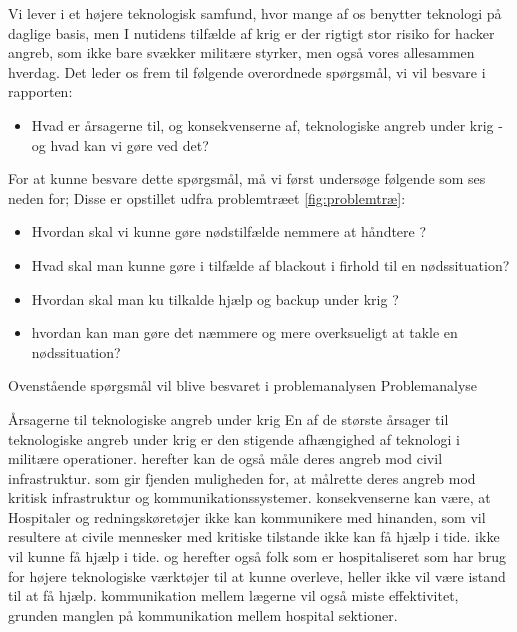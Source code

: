 Vi lever i et højere teknologisk samfund, hvor mange af os benytter teknologi på daglige basis, men I nutidens tilfælde af krig er der rigtigt stor risiko for hacker angreb, som ikke bare svækker militære styrker, men også vores allesammen hverdag.
Det leder os frem til følgende overordnede spørgsmål, vi vil besvare i rapporten:

\begin{itemize}
    \item Hvad er årsagerne til, og konsekvenserne af, teknologiske angreb under krig - og hvad kan vi gøre ved det?
\end{itemize}

For at kunne besvare dette spørgsmål, må vi først undersøge følgende som ses neden for; Disse er opstillet udfra problemtræet \ref{fig:problemtræ}:
\begin{itemize}
    \item Hvordan skal vi kunne gøre nødstilfælde nemmere at håndtere ?
    \item Hvad skal man kunne gøre i tilfælde af blackout i firhold til en nødssituation?
    \item Hvordan skal man ku tilkalde hjælp og backup under krig ?
    \item hvordan kan man gøre det næmmere og mere overksueligt at takle en nødssituation?
\end{itemize}

Ovenstående spørgsmål vil blive besvaret i problemanalysen
Problemanalyse

Årsagerne til teknologiske angreb under krig
En af de største årsager til teknologiske angreb under krig er den stigende afhængighed af teknologi i militære operationer.
herefter kan de også måle deres angreb mod civil infrastruktur. som gir fjenden muligheden for, at målrette deres angreb mod kritisk infrastruktur og kommunikationssystemer. konsekvenserne kan være, at Hospitaler og redningskøretøjer ikke kan kommunikere med hinanden, som vil resultere at civile mennesker med kritiske tilstande ikke kan få hjælp i tide.
ikke vil kunne få hjælp i tide. og herefter også folk som er hospitaliseret som har brug for højere teknologiske værktøjer til at kunne overleve, heller ikke vil være istand til at få hjælp. kommunikation mellem lægerne vil også miste effektivitet, grunden manglen på kommunikation mellem hospital sektioner.
